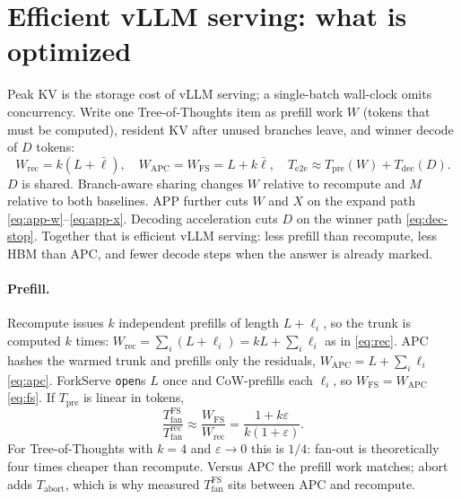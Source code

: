 \documentclass[11pt,a4paper]{article}
\begin{document}
\section{Efficient vLLM serving: what is optimized}

Peak KV is the storage cost of vLLM serving; a single-batch wall-clock omits concurrency.
Write one Tree-of-Thoughts item as prefill work $W$ (tokens that must be computed), resident KV after unused branches leave, and winner decode of $D$ tokens:
\begin{equation}
\label{eq:sys}
W_{\mathrm{rec}}=k(L+\bar\ell),
\quad
W_{\mathrm{APC}}=W_{\mathrm{FS}}=L+k\bar\ell,
\quad
T_{\mathrm{e2e}}
  \approx T_{\mathrm{pre}}(W)+T_{\mathrm{dec}}(D).
\end{equation}
$D$ is shared. Branch-aware sharing changes $W$ relative to recompute and $M$ relative to both baselines.
APP further cuts $W$ and $X$ on the expand path \eqref{eq:app-w}--\eqref{eq:app-x}.
Decoding acceleration cuts $D$ on the winner path \eqref{eq:dec-stop}.
Together that is efficient vLLM serving: less prefill than recompute, less HBM than APC, and fewer decode steps when the answer is already marked.

\paragraph{Prefill.}
Recompute issues $k$ independent prefills of length $L+\ell_i$, so the trunk is computed $k$ times:
$W_{\mathrm{rec}}=\sum_i(L+\ell_i)=kL+\sum_i\ell_i$ as in \eqref{eq:rec}.
APC hashes the warmed trunk and prefills only the residuals, $W_{\mathrm{APC}}=L+\sum_i\ell_i$ \eqref{eq:apc}.
ForkServe \texttt{open}s $L$ once and CoW-prefills each $\ell_i$, so $W_{\mathrm{FS}}=W_{\mathrm{APC}}$ \eqref{eq:fs}.
If $T_{\mathrm{pre}}$ is linear in tokens,
\begin{equation}
\label{eq:tfan}
\frac{T_{\mathrm{fan}}^{\mathrm{FS}}}{T_{\mathrm{fan}}^{\mathrm{rec}}}
  \approx
\frac{W_{\mathrm{FS}}}{W_{\mathrm{rec}}}
  =\frac{1+k\varepsilon}{k(1+\varepsilon)}.
\end{equation}
For Tree-of-Thoughts with $k{=}4$ and $\varepsilon\to 0$ this is $1/4$: fan-out is theoretically four times cheaper than recompute.
Versus APC the prefill work matches; abort adds $T_{\mathrm{abort}}$, which is why measured $T_{\mathrm{fan}}^{\mathrm{FS}}$ sits between APC and recompute.
\end{document}
